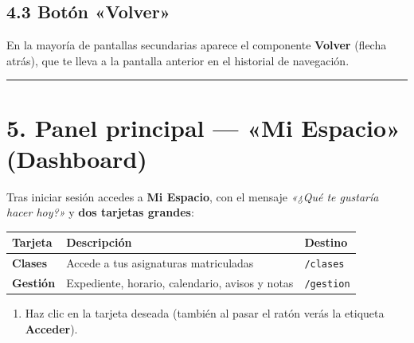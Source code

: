 \documentclass[
  spanish,
  11pt,
]{report}
\newcounter{none} %
\providecommand{\tightlist}{%
  \setlength{\itemsep}{0pt}\setlength{\parskip}{0pt}}
\begin{document}
\subsection{4.3 Botón «Volver»}\label{botuxf3n-volver}

En la mayoría de pantallas secundarias aparece el componente
\textbf{Volver} (flecha atrás), que te lleva a la pantalla anterior en
el historial de navegación.

\begin{center}\rule{0.5\linewidth}{0.5pt}\end{center}

\section{5. Panel principal --- «Mi Espacio»
(Dashboard)}\label{panel-principal-mi-espacio-dashboard}

Tras iniciar sesión accedes a \textbf{Mi Espacio}, con el mensaje
\emph{«¿Qué te gustaría hacer hoy?»} y \textbf{dos tarjetas grandes}:

{\def\LTcaptype{none} %
\begin{longtable}[]{@{}
  >{\raggedright\arraybackslash}p{}
  >{\raggedright\arraybackslash}p{}
  >{\raggedright\arraybackslash}p{}@{}}
\toprule\noalign{}
\begin{minipage}[b]{\linewidth}\raggedright
Tarjeta
\end{minipage} & \begin{minipage}[b]{\linewidth}\raggedright
Descripción
\end{minipage} & \begin{minipage}[b]{\linewidth}\raggedright
Destino
\end{minipage} \\
\midrule\noalign{}
\endhead
\bottomrule\noalign{}
\endlastfoot
\textbf{Clases} & Accede a tus asignaturas matriculadas &
\texttt{/clases} \\
\textbf{Gestión} & Expediente, horario, calendario, avisos y notas &
\texttt{/gestion} \\
\end{longtable}
}

\begin{enumerate}
\def\labelenumi{\arabic{enumi}.}
\tightlist
\item
  Haz clic en la tarjeta deseada (también al pasar el ratón verás la
  etiqueta \textbf{Acceder}).
\end{enumerate}
\end{document}
